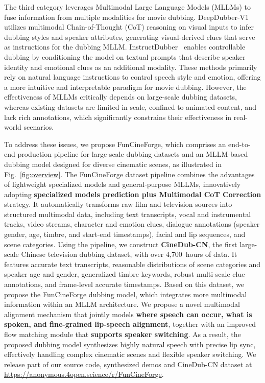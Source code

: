 \documentclass{article}
\begin{document}
The third category leverages Multimodal Large Language Models (MLLMs) to fuse information from multiple modalities for movie dubbing. 
DeepDubber-V1~\cite{DeepDubber-V1} utilizes multimodal Chain-of-Thought (CoT) reasoning on visual inputs 
to infer dubbing styles and speaker attributes, 
generating visual-derived clues that serve as instructions for the dubbing MLLM.
InstructDubber~\cite{InstructDubber} enables controllable dubbing by conditioning the model on textual prompts 
that describe speaker identity and emotional clues as an additional modality.
These methods primarily rely on natural language instructions to control speech style and emotion, 
offering a more intuitive and interpretable paradigm for movie dubbing.
However, the effectiveness of MLLMs critically depends on large-scale dubbing datasets, whereas existing datasets are limited in scale, 
confined to animated content, and lack rich annotations, which significantly constrains their effectiveness in real-world scenarios.

To address these issues, we propose FunCineForge,
which comprises an end-to-end production pipeline for large-scale dubbing datasets 
and an MLLM-based dubbing model designed for diverse cinematic scenes, as illustrated in Fig.~\ref{fig:overview}.
The FunCineForge dataset pipeline combines the advantages of lightweight specialized models and general-purpose MLLMs,
innovatively adopting {\bf specialized models prediction plus Multimodal CoT Correction} strategy.
It automatically transforms raw film and television sources into structured multimodal data, 
including text transcripts, vocal and instrumental tracks, video streams, 
character and emotion clues, dialogue annotations (speaker gender, age, timbre, and start-end timestamps), 
facial and lip sequences, and scene categories.
Using the pipeline, we construct {\bf CineDub-CN}, the first large-scale Chinese television dubbing dataset, with over 4,700~hours of data.
It features accurate text transcripts, reasonable distributions of scene categories and speaker age and gender, 
generalized timbre keywords, robust multi-scale clue annotations, and frame-level accurate timestamps.
Based on this dataset, we propose the FunCineForge dubbing model, 
which integrates more multimodal information within an MLLM architecture.
We propose a novel multimodal alignment mechanism that jointly models {\bf where speech can occur, what is spoken, and ﬁne-grained lip-speech alignment},
together with an improved flow matching module that {\bf supports speaker switching}.
As a result, the proposed dubbing model synthesizes highly natural speech with precise lip sync,
effectively handling complex cinematic scenes and flexible speaker switching.
We release part of our source code, synthesized demos and CineDub-CN dataset at \url{https://anonymous.4open.science/r/FunCineForge}.
\end{document}

